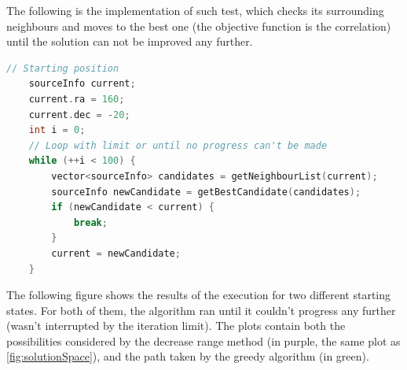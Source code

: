 The following is the implementation of such test, which checks its surrounding neighbours and moves to the best one (the objective function is the correlation) until the solution can not be improved any further.

\begin{minipage}{\linewidth}
	\begin{lstlisting}[language=c, caption=Hill Climbing]
	// Starting position
	sourceInfo current;
	current.ra = 160;
	current.dec = -20;
	int i = 0;
	// Loop with limit or until no progress can't be made
	while (++i < 100) {
		vector<sourceInfo> candidates = getNeighbourList(current);
		sourceInfo newCandidate = getBestCandidate(candidates);
		if (newCandidate < current) {
			break;
		}
		current = newCandidate;
	}
	\end{lstlisting}
\end{minipage}

The following figure shows the results of the execution for two different starting states. For both of them, the algorithm ran until it couldn't progress any further (wasn't interrupted by the iteration limit). The plots contain both the possibilities considered by the decrease range method (in purple, the same plot as \ref{fig:solutionSpace}), and the path taken by the greedy algorithm (in green).

